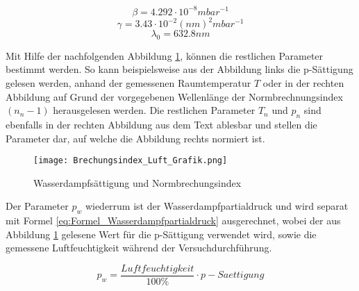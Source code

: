 \begin{equation*}
\beta = 4.292 \cdot 10^{-8} mbar^{-1}
\label{eq:Faktor_Beta}
\end{equation*}
\begin{equation*}
\gamma = 3.43 \cdot 10^{-2} (nm)^{2}mbar^{-1}
\label{eq:Faktor_Gamma}
\end{equation*}
\begin{equation*}
\lambda_{0} = 632.8 nm
\label{eq:Faktor_Lambda}
\end{equation*}

Mit Hilfe der nachfolgenden Abbildung \ref{fig:Wasserdampfsättigung und Normbrechungsindex}, können die restlichen Parameter bestimmt werden. So kann beispielsweise aus der Abbildung links die p-Sättigung gelesen werden, anhand der gemessenen Raumtemperatur $T$ oder in der rechten Abbildung auf Grund der vorgegebenen Wellenlänge der Normbrechnungsindex $(n_{n} - 1)$ herausgelesen werden. Die restlichen Parameter $T_{n}$ und $p_{n}$ sind ebenfalls in der rechten Abbildung aus dem Text ablesbar und stellen die Parameter dar, auf welche die Abbildung rechts normiert ist.

\begin{figure}[b]
\texttt{[image: Brechungsindex\_Luft\_Grafik.png]}
\caption{Wasserdampfsättigung und Normbrechungsindex}
\label{fig:Wasserdampfsättigung und Normbrechungsindex}
\end{figure}

Der Parameter $p_{w}$ wiederrum ist der Wasserdampfpartialdruck und wird separat mit Formel \ref{eq:Formel_Wasserdampfpartialdruck} ausgerechnet, wobei der aus Abbildung \ref{fig:Wasserdampfsättigung und Normbrechungsindex} gelesene Wert für die p-Sättigung verwendet wird, sowie die gemessene Luftfeuchtigkeit während der Versuchdurchführung.


\begin{equation}
p_{w} = \dfrac{Luftfeuchtigkeit}{100\%}\cdot p-Saettigung
\label{eq:Formel_Wasserdampfpartialdruck}
\end{equation}

